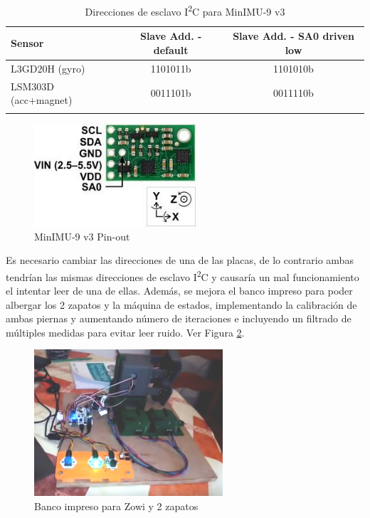 \begin{table}[h]
\centering
\begin{tabular}{l c c}
\toprule
\textbf{Sensor} & \textbf{Slave Add. - default} & \textbf{Slave Add. - SA0 driven low} \\
\midrule
L3GD20H (gyro) & 1101011b & 1101010b \\
LSM303D (acc+magnet) & 0011101b & 0011110b \\
\bottomrule\\
\end{tabular}
\caption{Direcciones de esclavo I\textsuperscript{2}C para MinIMU-9 v3}
\label{tablei2c}
\end{table}

\begin{figure}[h]
\centering
\includegraphics[width=60mm]{Figures/minimu_sa0}
\caption[MinIMU-9 v3 Pin-out]{MinIMU-9 v3 Pin-out}
\label{fig:minimu_sa0}
\end{figure}

Es necesario cambiar las direcciones de una de las placas, de lo contrario ambas tendrían las mismas direcciones de esclavo I\textsuperscript{2}C y causaría un mal funcionamiento el intentar leer de una de ellas. Además, se mejora el banco impreso para poder albergar los 2 zapatos y la máquina de estados, implementando la calibración de ambas piernas y aumentando número de iteraciones e incluyendo un filtrado de múltiples medidas para evitar leer ruido. Ver Figura \ref{fig:banco_2zapato}.

\begin{figure} [h]
\centering
\includegraphics[width=70mm]{Figures/banco_2zapato}
\caption[Banco 1 zapato]{Banco impreso para Zowi y 2 zapatos}
\label{fig:banco_2zapato}
\end{figure}

